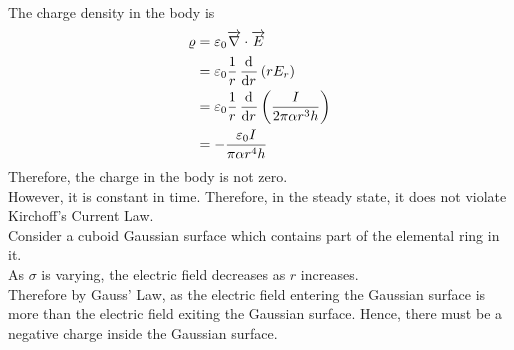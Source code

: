 \documentclass[fleqn, a4paper, 12pt, twoside]{article}
\theoremstyle{definition}
\theoremstyle{theorem}
\begin{document}
\begin{solution}
\begin{enumerate}[leftmargin = *]
			~\\
			The charge density in the body is
			\begin{align*}
				\varrho &= \varepsilon_0 \overrightarrow{\nabla} \cdot \overrightarrow{E}\\
				&= \varepsilon_0 \frac{1}{r} \dod{}{r} (r E_r)\\
				&= \varepsilon_0 \frac{1}{r} \dod{}{r} \left( \frac{I}{2 \pi \alpha r^3 h} \right)\\
				&= -\frac{\varepsilon_0 I}{\pi \alpha r^4 h}
			\end{align*}
			Therefore, the charge in the body is not zero.\\
			However, it is constant in time.
			Therefore, in the steady state, it does not violate Kirchoff's Current Law.\\
			Consider a cuboid Gaussian surface which contains part of the elemental ring in it.\\
			As $\sigma$ is varying, the electric field decreases as $r$ increases.\\
			Therefore by Gauss' Law, as the electric field entering the Gaussian surface is more than the electric field exiting the Gaussian surface.
			Hence, there must be a negative charge inside the Gaussian surface.
	\end{enumerate}
\end{solution}
\end{document}
